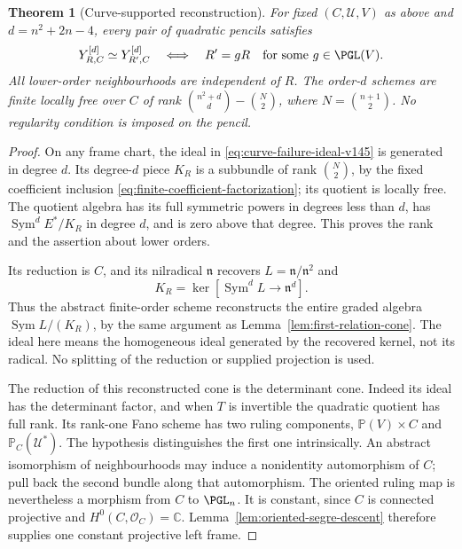 \documentclass[11pt,reqno]{amsart}
\numberwithin{equation}{section}
\newtheorem{theorem}{Theorem}[section]
\theoremstyle{definition}\newtheorem{definition}[theorem]{Definition}
\theoremstyle{remark}\newtheorem{remark}[theorem]{Remark}
\newcommand{\C}{\mathbb C}\newcommand{\Q}{\mathbb Q}
\newcommand{\Pj}{\mathbb P}\newcommand{\A}{\mathbb A}
\newcommand{\OO}{\mathcal O}\newcommand{\II}{\mathcal I}
\DeclareMathOperator{\Sym}{Sym}\DeclareMathOperator{\Gr}{Gr}
\begin{document}
\begin{theorem}[Curve-supported reconstruction]
\label{thm:curve-reconstruction-v145}
For fixed \((C,\mathcal U,V)\) as above and
\(d=n^2+2n-4\), every pair of quadratic pencils satisfies
\begin{equation}\label{eq:curve-torelli-v145}
 Y_{R,C}^{[d]}\simeq Y_{R',C}^{[d]}
       \quad\Longleftrightarrow\quad R'=gR
              \quad\text{for some }g\in\PGL(V).
\end{equation}
All lower-order neighbourhoods are independent of \(R\).
The order-\(d\) schemes are finite locally free over \(C\) of rank
\(\binom{n^2+d}{d}-\binom{N}{2}\), where \(N=\binom{n+1}{2}\).
No regularity condition is imposed on the pencil.
\end{theorem}
\begin{proof}
On any frame chart, the ideal in
\eqref{eq:curve-failure-ideal-v145} is generated in degree \(d\).
Its degree-\(d\) piece \(K_R\) is a subbundle of rank
\(\binom N2\), by the fixed coefficient inclusion
\eqref{eq:finite-coefficient-factorization}; its quotient is locally
free.  The quotient algebra has its full symmetric powers in degrees
less than \(d\), has \(\Sym^dE^*/K_R\) in degree \(d\),
and is zero above that degree.  This proves the rank and the assertion
about lower orders.

Its reduction is \(C\), and its nilradical \(\mathfrak n\)
recovers \(L=\mathfrak n/\mathfrak n^2\) and
\[
       K_R=\ker[\Sym^dL\longrightarrow\mathfrak n^d].
\]
Thus the abstract finite-order scheme reconstructs the entire graded
algebra \(\Sym L/(K_R)\), by the same argument as
Lemma~\ref{lem:first-relation-cone}.  The ideal here means the
homogeneous ideal generated by the recovered kernel, not its radical.
No splitting of the reduction or supplied projection is used.

The reduction of this reconstructed cone is the determinant cone.
Indeed its ideal has the determinant factor, and when \(T\) is
invertible the quadratic quotient has full rank.  Its rank-one Fano
scheme has two ruling components,
\(\Pj(V)\times C\) and \(\Pj_C(\mathcal U^*)\).
The hypothesis distinguishes the first one intrinsically.  An abstract
isomorphism of neighbourhoods may induce a nonidentity automorphism
of \(C\); pull back the second bundle along that automorphism.
The oriented ruling map is nevertheless a morphism from \(C\) to
\(\PGL_n\).  It is constant, since \(C\) is connected projective
and \(H^0(C,\OO_C)=\C\).  Lemma~\ref{lem:oriented-segre-descent}
therefore supplies one constant projective left frame.


\end{proof}
\end{document}
